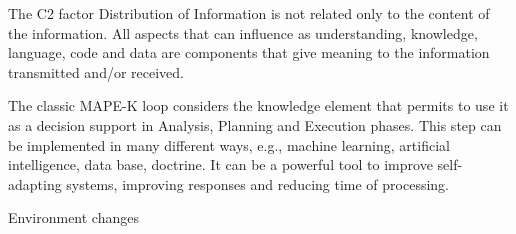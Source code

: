 The C2 factor Distribution of Information is not related only to the content of the information. All aspects that can influence as understanding, knowledge, language, code and data are components that give meaning to the information transmitted and/or received.

The classic MAPE-K loop considers the knowledge element that permits to use it as a decision support in Analysis, Planning and Execution phases. This step can be implemented in many different ways, e.g., machine learning, artificial intelligence, data base, doctrine. It can be a powerful tool to improve self-adapting systems, improving responses and reducing time of processing.

Environment changes